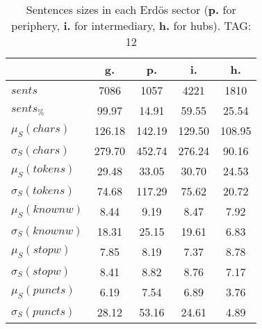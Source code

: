 \begin{table}[h!]
\begin{center}
\begin{tabular}{| l || c | c | c | c |}\hline
 & {\bf g.} & {\bf p.} & {\bf i.} & {\bf h.} \\\hline\hline
$sents$ & 7086  & 1057  & 4221  & 1810 \\
$sents_{\%}$ & 99.97  & 14.91  & 59.55  & 25.54 \\\hline
$\mu_S(chars)$ & 126.18  & 142.19  & 129.50  & 108.95 \\
$\sigma_S(chars)$ & 279.70  & 452.74  & 276.24  & 90.16 \\\hline
$\mu_S(tokens)$ & 29.48  & 33.05  & 30.70  & 24.53 \\
$\sigma_S(tokens)$ & 74.68  & 117.29  & 75.62  & 20.72 \\\hline
$\mu_S(knownw)$ & 8.44  & 9.19  & 8.47  & 7.92 \\
$\sigma_S(knownw)$ & 18.31  & 25.15  & 19.61  & 6.83 \\\hline
$\mu_S(stopw)$ & 7.85  & 8.19  & 7.37  & 8.78 \\
$\sigma_S(stopw)$ & 8.41  & 8.82  & 8.76  & 7.17 \\\hline
$\mu_S(puncts)$ & 6.19  & 7.54  & 6.89  & 3.76 \\
$\sigma_S(puncts)$ & 28.12  & 53.16  & 24.61  & 4.89 \\\hline
\end{tabular}
\caption{Sentences sizes in each Erd\"os sector ({{\bf p.}} for periphery, {{\bf i.}} for intermediary, {{\bf h.}} for hubs). TAG: 12}
\end{center}
\end{table}